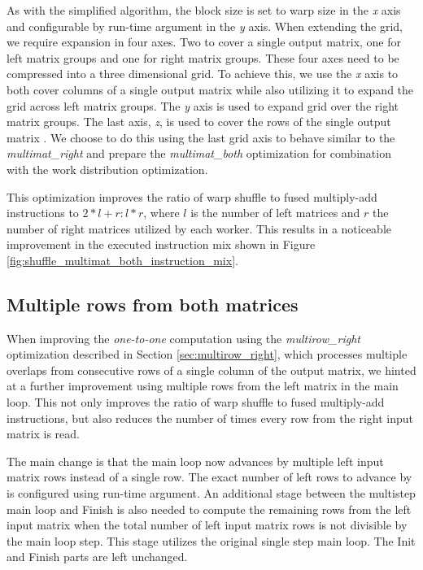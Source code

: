 As with the simplified algorithm, the block size is set to warp size in the \textit{x} axis and configurable by run-time argument in the \textit{y} axis. 
When extending the grid, we require expansion in four axes. Two to cover a single output matrix, one for left matrix groups and one for right matrix groups. 
These four axes need to be compressed into a three dimensional grid. To achieve this, we use the \textit{x} axis to both cover columns of a single output matrix while also utilizing it to expand the grid across left matrix groups. The \textit{y} axis is used to expand grid over the right matrix groups. The last axis, \textit{z}, is used to cover the rows of the single output matrix . We choose to do this using the last grid axis to behave similar to the \textit{multimat\_right} and prepare the \textit{multimat\_both} optimization for combination with the work distribution optimization. 



This optimization improves the ratio of warp shuffle to fused multiply-add instructions to $ 2 * l + r : l * r$, where $l$ is the number of left matrices and $r$ the number of right matrices utilized by each worker. This results in a noticeable improvement in the executed instruction mix shown in Figure \ref{fig:shuffle_multimat_both_instruction_mix}. 


\subsection{Multiple rows from both matrices}
\label{sec:multirow_both}

When improving the \textit{one-to-one} computation using the \textit{multirow\_right} optimization described in Section \ref{sec:multirow_right}, which processes multiple overlaps from consecutive rows of a single column of the output matrix, we hinted at a further improvement using multiple rows from the left matrix in the main loop. This not only improves the ratio of warp shuffle to fused multiply-add instructions, but also reduces the number of times every row from the right input matrix is read. 

The main change is that the main loop now advances by multiple left input matrix rows instead of a single row. The exact number of left rows to advance by is configured using run-time argument. An additional stage between the multistep main loop and Finish is also needed to compute the remaining rows from the left input matrix when the total number of left input matrix rows is not divisible by the main loop step. This stage utilizes the original single step main loop. The Init and Finish parts are left unchanged.

